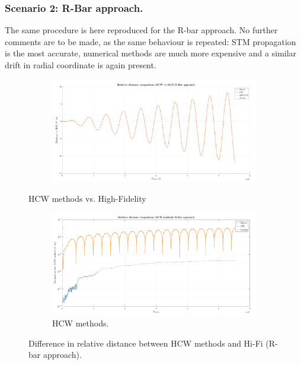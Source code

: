 		\subsubsection{Scenario 2: R-Bar approach. }
		\indent The same procedure is here reproduced for the R-bar approach. No further comments are to be made, as the same behaviour is repeated: STM propagation is the most accurate, numerical methods are much more expensive and a similar drift in radial coordinate is again present.
		\begin{figure}[!htb]
		\begin{subfigure}[t]{.8\linewidth}
		\begin{changemargin}{-2.2cm}{-1cm}
		\begin{adjustbox}{width=1.2\textwidth}
		\centering\includegraphics[width = \linewidth]{Chapters/Chapter_02/dr_comp_R_bar_approach}
		\end{adjustbox}
		\end{changemargin}
		\end{subfigure}
		\caption{HCW methods vs. High-Fidelity}
		\label{figCh2:dr_comp_HiFi_R_bar_approach}
		\end{figure}
		\begin{figure}[!htb]
		\ContinuedFloat
		\begin{subfigure}[t]{.8\linewidth}
		\begin{changemargin}{-2.2cm}{-1cm}
		\begin{adjustbox}{width=1.2\textwidth}
		\centering\includegraphics[width = \linewidth]{Chapters/Chapter_02/dr_comp_HCW_R_bar_approach}
		\end{adjustbox}
		\end{changemargin}
		\caption{HCW methods.}
		\label{figCh2:dr_comp_HCW_R_bar_approach}
		\end{subfigure}
		\caption{Difference in relative distance between HCW methods and Hi-Fi (R-bar approach).}
		\end{figure}
